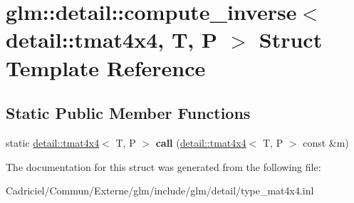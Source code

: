 \hypertarget{structglm_1_1detail_1_1compute__inverse_3_01detail_1_1tmat4x4_00_01_t_00_01_p_01_4}{}\section{glm\+:\+:detail\+:\+:compute\+\_\+inverse$<$ detail\+:\+:tmat4x4, T, P $>$ Struct Template Reference}
\label{structglm_1_1detail_1_1compute__inverse_3_01detail_1_1tmat4x4_00_01_t_00_01_p_01_4}
\subsection*{Static Public Member Functions}
\begin{DoxyCompactItemize}
\item 
static \hyperlink{structglm_1_1detail_1_1tmat4x4}{detail\+::tmat4x4}$<$ T, P $>$ {\bfseries call} (\hyperlink{structglm_1_1detail_1_1tmat4x4}{detail\+::tmat4x4}$<$ T, P $>$ const \&m)\hypertarget{structglm_1_1detail_1_1compute__inverse_3_01detail_1_1tmat4x4_00_01_t_00_01_p_01_4_a8fd080ed01ae197f2274742a8f1417f3}{}\label{structglm_1_1detail_1_1compute__inverse_3_01detail_1_1tmat4x4_00_01_t_00_01_p_01_4_a8fd080ed01ae197f2274742a8f1417f3}

\end{DoxyCompactItemize}


The documentation for this struct was generated from the following file\+:\begin{DoxyCompactItemize}
\item 
Cadriciel/\+Commun/\+Externe/glm/include/glm/detail/type\+\_\+mat4x4.\+inl\end{DoxyCompactItemize}
